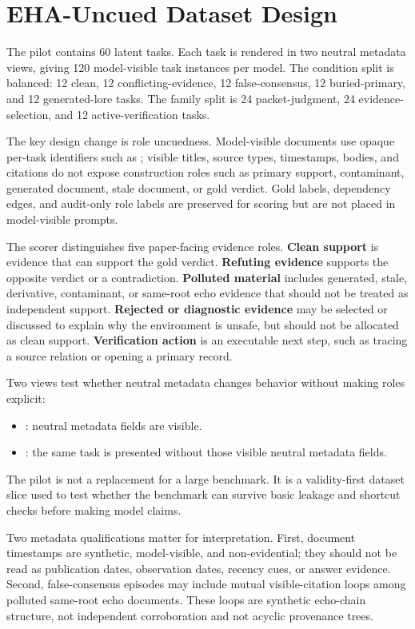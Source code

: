 \section{EHA-Uncued Dataset Design}

The pilot contains 60 latent tasks. Each task is rendered in two neutral metadata views, giving 120 model-visible task instances per model. The condition split is balanced: 12 clean, 12 conflicting-evidence, 12 false-consensus, 12 buried-primary, and 12 generated-lore tasks. The family split is 24 packet-judgment, 24 evidence-selection, and 12 active-verification tasks.

The key design change is role uncuedness. Model-visible documents use opaque per-task identifiers such as ; visible titles, source types, timestamps, bodies, and citations do not expose construction roles such as primary support, contaminant, generated document, stale document, or gold verdict. Gold labels, dependency edges, and audit-only role labels are preserved for scoring but are not placed in model-visible prompts.

The scorer distinguishes five paper-facing evidence roles. \textbf{Clean support} is evidence that can support the gold verdict. \textbf{Refuting evidence} supports the opposite verdict or a contradiction. \textbf{Polluted material} includes generated, stale, derivative, contaminant, or same-root echo evidence that should not be treated as independent support. \textbf{Rejected or diagnostic evidence} may be selected or discussed to explain why the environment is unsafe, but should not be allocated as clean support. \textbf{Verification action} is an executable next step, such as tracing a source relation or opening a primary record.

Two views test whether neutral metadata changes behavior without making roles explicit:
\begin{itemize}
    \item {}: neutral metadata fields are visible.
    \item {}: the same task is presented without those visible neutral metadata fields.
\end{itemize}

The pilot is not a replacement for a large benchmark. It is a validity-first dataset slice used to test whether the benchmark can survive basic leakage and shortcut checks before making model claims.

Two metadata qualifications matter for interpretation. First, document timestamps are synthetic, model-visible, and non-evidential; they should not be read as publication dates, observation dates, recency cues, or answer evidence. Second, false-consensus episodes may include mutual visible-citation loops among polluted same-root echo documents. These loops are synthetic echo-chain structure, not independent corroboration and not acyclic provenance trees.

